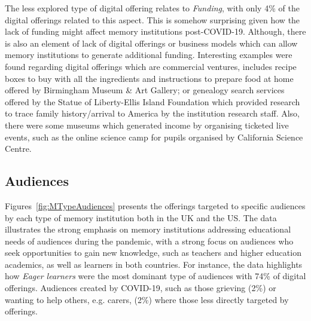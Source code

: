 \documentclass{egpubl}
\begin{document}





The less explored type of digital offering relates to \emph{Funding}, with only 4\% of the digital offerings related to this aspect. This is somehow surprising given how the lack of funding might affect memory institutions post-COVID-19. Although, there is also an element of lack of digital offerings or business models which can allow memory institutions to generate additional funding. Interesting examples were found regarding digital offerings which are commercial ventures, includes recipe boxes to buy with all the ingredients and instructions to prepare food at home offered by Birmingham Museum \& Art Gallery; or genealogy search services offered by the Statue of Liberty-Ellis Island Foundation which provided research to trace family history/arrival to America by the institution research staff. Also, there were some museums which generated income by organising ticketed live events, such as the online science camp for pupils organised by California Science Centre.





\subsection{Audiences}
\label{aud}

Figures~\ref{fig:MTypeAudiences} presents the offerings targeted to specific audiences by each type of memory institution both in the UK and the US. The data illustrates the strong emphasis on memory institutions addressing educational needs of audiences during the pandemic, with a strong focus on audiences who seek opportunities to gain new knowledge, such as teachers and higher education academics, as well as learners in both countries. For instance, the data highlights how \emph{Eager learners} were the most dominant type of audiences with 74\% of digital offerings. Audiences created by COVID-19, such as those grieving (2\%) or wanting to help others, e.g. carers, (2\%) where those less directly targeted by offerings.
\end{document}
